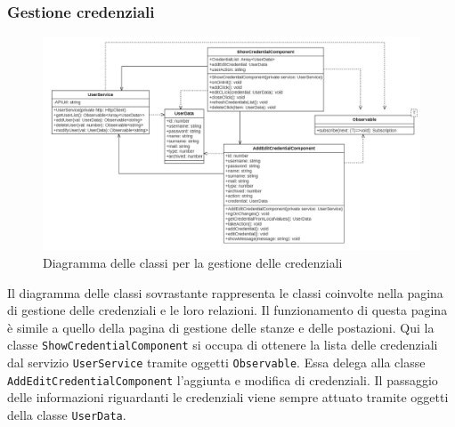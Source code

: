 \subsubsection{Gestione credenziali}
\begin{figure}[H]
	\centering
	\includegraphics[width=18cm]{res/images/webapp-credenziali-diagrammaClassi.png}
	\caption{Diagramma delle classi per la gestione delle credenziali}
	\label{fig:DiagrammaClassiCredenziali}
\end{figure}
Il diagramma delle classi sovrastante rappresenta le classi coinvolte nella pagina di gestione delle credenziali e le loro relazioni. Il funzionamento di questa pagina è simile a quello della pagina di gestione delle stanze e delle postazioni. Qui la classe \texttt{ShowCredentialComponent} si occupa di ottenere la lista delle credenziali dal servizio \texttt{UserService} tramite oggetti \texttt{Observable}. Essa delega alla classe \texttt{AddEditCredentialComponent} l'aggiunta e modifica di credenziali. Il passaggio delle informazioni riguardanti le credenziali viene sempre attuato tramite oggetti della classe \texttt{UserData}.


